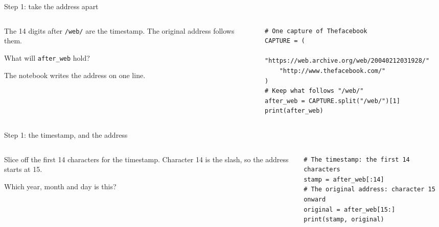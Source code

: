 \documentclass[9pt,aspectratio=169]{beamer}
\begin{document}
\begin{frame}[fragile]{Step 1: take the address apart}
    \begin{columns}[T]
        \begin{column}{0.37\textwidth}
            The 14 digits after \texttt{/web/} are the timestamp. The original address follows them.

            \medskip
            What will \texttt{after\_web} hold?

            \medskip
            The notebook writes the address on one line.
        \end{column}
        \begin{column}{0.6\textwidth}
\begin{lstlisting}
# One capture of Thefacebook
CAPTURE = (
    "https://web.archive.org/web/20040212031928/"
    "http://www.thefacebook.com/"
)
# Keep what follows "/web/"
after_web = CAPTURE.split("/web/")[1]
print(after_web)
\end{lstlisting}
        \end{column}
    \end{columns}
\end{frame}

\begin{frame}[fragile]{Step 1: the timestamp, and the address}
    \begin{columns}[T]
        \begin{column}{0.37\textwidth}
            Slice off the first 14 characters for the timestamp. Character 14 is the slash, so the address starts at 15.

            \medskip
            Which year, month and day is this?
        \end{column}
        \begin{column}{0.6\textwidth}
\begin{lstlisting}
# The timestamp: the first 14 characters
stamp = after_web[:14]
# The original address: character 15 onward
original = after_web[15:]
print(stamp, original)
\end{lstlisting}
        \end{column}
    \end{columns}
\end{frame}
\end{document}
